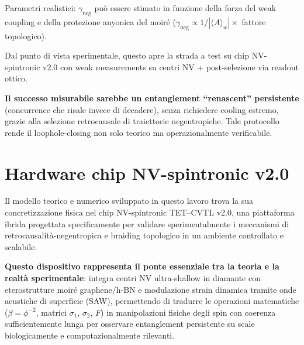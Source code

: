 \documentclass[11pt,a4paper]{article}
\theoremstyle{plain}
\theoremstyle{definition}
\begin{document}
\vspace{0.4cm}

Parametri realistici: \( \gamma_{\text{neg}} \) può essere stimato in funzione della forza del weak coupling e della protezione anyonica del moiré (\( \gamma_{\text{neg}} \propto 1/|\langle A \rangle_w| \times \) fattore topologico). 

\vspace{0.3cm}

Dal punto di vista sperimentale, questo apre la strada a test su chip NV-spintronic v2.0 con weak measurements su centri NV + post-selezione via readout ottico. 


\vspace{0.4cm}

\textbf{Il successo misurabile sarebbe un entanglement ``renascent'' persistente} (concurrence che risale invece di decadere), senza richiedere cooling estremo, grazie alla selezione retrocausale di traiettorie negentropiche. Tale protocollo rende il loophole-closing non solo teorico ma operazionalmente verificabile.




\vspace{0.5cm}




\section{Hardware chip NV-spintronic v2.0}
\label{sec:hardware_chip}

\vspace{0.2cm}

Il modello teorico e numerico sviluppato in questo lavoro trova la sua concretizzazione fisica nel chip NV-spintronic TET–CVTL v2.0, una piattaforma ibrida progettata specificamente per validare sperimentalmente i meccanismi di retrocausalità-negentropica e braiding topologico in un ambiente controllato e scalabile. 


\vspace{0.3cm}



\textbf{Questo dispositivo rappresenta il ponte essenziale tra la teoria e la realtà sperimentale}: integra centri NV ultra-shallow in diamante con eterostrutture moiré graphene/h-BN e modulazione strain dinamica tramite onde acustiche di superficie (SAW), permettendo di tradurre le operazioni matematiche ($\beta = \phi^{-2}$, matrici $\sigma_1$, $\sigma_2$, $F$) in manipolazioni fisiche degli spin con coerenza sufficientemente lunga per osservare entanglement persistente su scale biologicamente e computazionalmente rilevanti.
\end{document}
